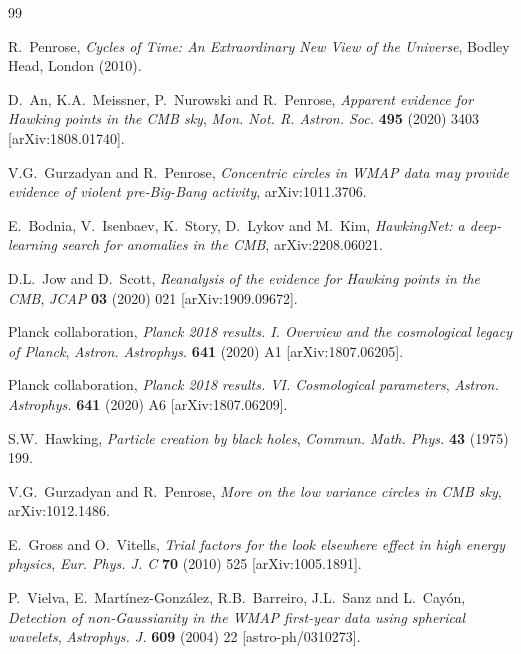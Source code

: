\documentclass[a4paper,11pt]{article}
\begin{document}
\begin{thebibliography}{99}

R.~Penrose, \emph{Cycles of Time: An Extraordinary New View of the Universe}, Bodley Head, London (2010).

D.~An, K.A.~Meissner, P.~Nurowski and R.~Penrose, \emph{Apparent evidence for Hawking points in the CMB sky}, \emph{Mon. Not. R. Astron. Soc.} {\bf 495} (2020) 3403 [arXiv:1808.01740].

V.G.~Gurzadyan and R.~Penrose, \emph{Concentric circles in WMAP data may provide evidence of violent pre-Big-Bang activity}, arXiv:1011.3706.

E.~Bodnia, V.~Isenbaev, K.~Story, D.~Lykov and M.~Kim, \emph{HawkingNet: a deep-learning search for anomalies in the CMB}, arXiv:2208.06021.

D.L.~Jow and D.~Scott, \emph{Reanalysis of the evidence for Hawking points in the CMB}, \emph{JCAP} {\bf 03} (2020) 021 [arXiv:1909.09672].

Planck collaboration, \emph{Planck 2018 results. I. Overview and the cosmological legacy of Planck}, \emph{Astron. Astrophys.} {\bf 641} (2020) A1 [arXiv:1807.06205].

Planck collaboration, \emph{Planck 2018 results. VI. Cosmological parameters}, \emph{Astron. Astrophys.} {\bf 641} (2020) A6 [arXiv:1807.06209].

S.W.~Hawking, \emph{Particle creation by black holes}, \emph{Commun. Math. Phys.} {\bf 43} (1975) 199.

V.G.~Gurzadyan and R.~Penrose, \emph{More on the low variance circles in CMB sky}, arXiv:1012.1486.

E.~Gross and O.~Vitells, \emph{Trial factors for the look elsewhere effect in high energy physics}, \emph{Eur. Phys. J. C} {\bf 70} (2010) 525 [arXiv:1005.1891].

P.~Vielva, E.~Mart\'inez-Gonz\'alez, R.B.~Barreiro, J.L.~Sanz and L.~Cay\'on, \emph{Detection of non-Gaussianity in the WMAP first-year data using spherical wavelets}, \emph{Astrophys. J.} {\bf 609} (2004) 22 [astro-ph/0310273].


\end{thebibliography}
\end{document}
